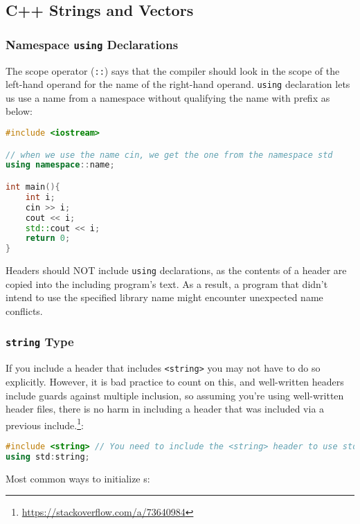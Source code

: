 \subsection{C++ Strings and Vectors}
\label{task:20231201_cpp}

\subsubsection{Namespace \texttt{using} Declarations}

The scope operator (\texttt{::}) says that the compiler should look in the scope of the left-hand operand for the name of the right-hand operand. \texttt{using} declaration lets us use a name from a namespace without qualifying the name with  prefix as below:
\begin{lstlisting}[language=C++]
#include <iostream>

// when we use the name cin, we get the one from the namespace std
using namespace::name;

int main(){
    int i;
    cin >> i;
    cout << i;
    std::cout << i;
    return 0;
}
\end{lstlisting}

Headers should NOT include \texttt{using} declarations, as the contents of a header are copied into the including program's text. As a result, a program that didn't intend to use the specified library name might encounter unexpected name conflicts.

\subsubsection{\texttt{string} Type}

If you include a header that includes \texttt{<string>} you may not have to do so explicitly. However, it is bad practice to count on this, and well-written headers include guards against multiple inclusion, so assuming you're using well-written header files, there is no harm in including a header that was included via a previous include.\footnote{\url{https://stackoverflow.com/a/73640984}}:

\begin{lstlisting}[language=C++]
#include <string> // You need to include the <string> header to use std::string.
using std:string; 
\end{lstlisting}

Most common ways to initialize s:

